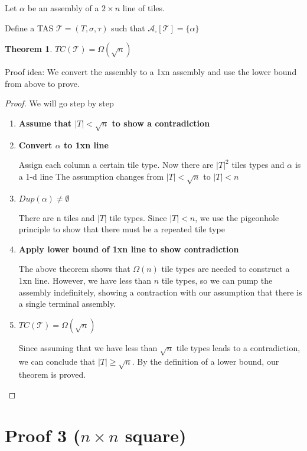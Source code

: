 \documentclass[12pt]{article}
\newtheorem{theorem}{Theorem}
\begin{document}
Let $\alpha$ be an assembly of a $2 \times n$ line of tiles.

Define a TAS $\mathcal{T} = (T, \sigma, \tau)$ such that $\mathcal{A}_\square[\mathcal{T}] = \{ \alpha \}$

\begin{theorem}
	$TC(\mathcal{T}) = \Omega(\sqrt{n})$
\end{theorem}

Proof idea: We convert the assembly to a 1xn assembly and use the lower bound from above to prove. 

\begin{proof}
		We will go step by step
	\begin{enumerate}

		\item \textbf{Assume that $|T| < \sqrt{n}$ to show a contradiction}

        \item \textbf{Convert $\alpha$ to 1xn line}

        Assign each column a certain tile type. Now there are $|T|^2$ tiles types and $\alpha$ is a 1-d line
        The assumption changes from $|T| < \sqrt{n}$ to $|T| < n$

		\item \textbf{$Dup(\alpha) \neq \emptyset$}

            There are n tiles and $|T|$ tile types. Since $|T| < n$, we use the pigeonhole principle to show that there must be a repeated tile type

		\item \textbf{Apply lower bound of 1xn line to show contradiction}

            The above theorem shows that $\Omega(n)$ tile types are needed to construct a 1xn line. However, we have less than $n$ tile types, so we can pump the assembly indefinitely, showing a contraction with our assumption that there is a single terminal assembly.

		\item \textbf{$TC(\mathcal{T}) = \Omega(\sqrt{n})$}

            Since assuming that we have less than $\sqrt{n}$ tile types leads to a contradiction, we can conclude that $|T| \geq \sqrt{n}$. By the definition of a lower bound, our theorem is proved.

	\end{enumerate}
\end{proof}


\section*{Proof 3 ($n \times n$ square)}
\end{document}
